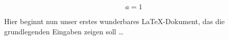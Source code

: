 \documentclass[10pt, a4paper]{article}
\begin{document}
 \begin{equation}
     a = 1
 \end{equation}

 Hier beginnt nun unser erstes wunderbares LaTeX-Dokument,
 das die grundlegenden Eingaben zeigen soll \dots
 
\end{document}
